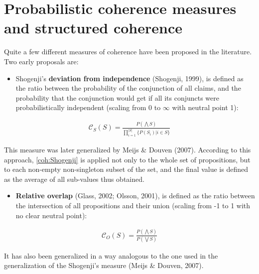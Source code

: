 \documentclass[
  10pt,
]{scrartcl}
\providecommand{\tightlist}{%
  \setlength{\itemsep}{0pt}\setlength{\parskip}{0pt}}
\begin{document}
\hypertarget{probabilistic-coherence-measures-and-structured-coherence}{%
\section{Probabilistic coherence measures and structured coherence}\label{probabilistic-coherence-measures-and-structured-coherence}}

\label{sec:measures}

Quite a few different measures of coherence have been proposed in the literature. Two early proposals are:

\begin{itemize}
\tightlist
\item
  Shogenji's
  \textbf{deviation from independence} (Shogenji, 1999), is defined as the ratio between the probability of the
  conjunction of all claims, and the probability that the conjunction
  would get if all its conjuncts were probabilistically independent (scaling from 0 to \(\infty\) with neutral point 1):
\end{itemize}

\begin{align}
    \tag{Shogenji}
    \label{coh:Shogenji}
     \mathcal{C}_{S}(S)=\frac{P(\bigwedge S)}{\prod_{i=1}^{\vert S \vert}\{P(S_i)\vert i \in S\}}
\end{align}

\noindent This measure was later generalized by Meijs \& Douven (2007). According to this approach, \eqref{coh:Shogenji} is applied not only to the whole set of propositions, but to each non-empty non-singleton subset of the set, and the final value is defined as the average of all sub-values thus obtained.

\begin{itemize}
\tightlist
\item
  \textbf{Relative overlap} (Glass, 2002; Olsson, 2001), is defined as the ratio between the intersection of all propositions and their union (scaling from -1 to 1 with no clear neutral point):
\end{itemize}

\begin{align}
    \tag{Olsson}
    \label{coh:Olsson}
    \mathcal{C}_{O}(S)=\frac{P(\bigwedge S)}{P(\bigvee S)}
\end{align}

\noindent It has also been generalized in a way analogous to the one used in the generalization of the Shogenji's measure (Meijs \& Douven, 2007).
\end{document}
